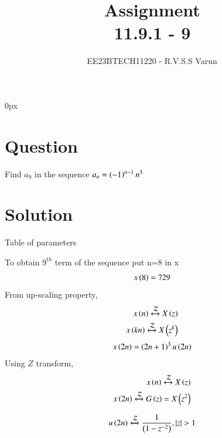 \documentclass[beamer]{IEEEtran}
\theoremstyle{remark}
\begin{document}
\parindent 0px


\title{Assignment\\[1ex]11.9.1 - 9}
\author{EE23BTECH11220 - R.V.S.S Varun$^{}$%
}
\maketitle
\newpage
\bigskip

\renewcommand{\thefigure}{\theenumi}
\renewcommand{\thetable}{\theenumi}
\section*{Question}
Find $a_{9}$ in the sequence $a_{n}=\left(-1\right)^{n-1}n^{3}$ 
\section*{Solution}
 
\begin{table}[h]
    \centering
   
    
    \caption{Table of parameters}
    \label{tab:11.9.1.9.1}
\end{table}


To obtain $9^{th}$ term of the sequence put n=8 in x
\begin{align}
x\left(8\right)=729
\end{align}
From up-scaling property,
\begin{align}
x\left(n\right)\xleftrightarrow{\mathcal{Z}} X\left(z\right) \\
x\left(kn\right)\xleftrightarrow{\mathcal{Z}} X\left(z^k\right)
\end{align}
\begin{align}
	x\left(2n\right)=\left(2n+1\right)^{3}u\left(2n\right)
\end{align}
Using  $Z$ transform,
\begin{align}
	x\left(n\right)\xleftrightarrow{\mathcal{Z}}X\left(z\right)\\
	x\left(2n\right)\xleftrightarrow{\mathcal{Z}}G\left(z\right)=X\left(z^2\right)
\end{align}


\begin{align}
	u\left(2n\right)\xleftrightarrow{\mathcal{Z}}\frac{1}{\left(1-z^{-2}\right)},\left\vert z\right\vert>1 
\end{align}
\end{document}

